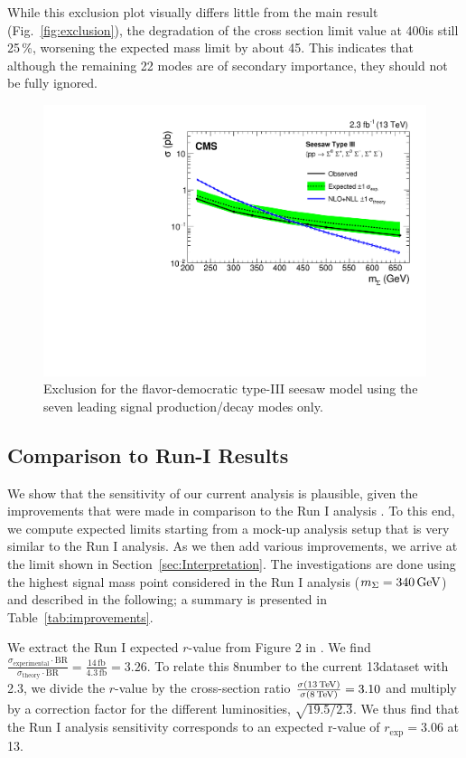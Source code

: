 While this exclusion plot visually differs little from the main result (Fig.~\ref{fig:exclusion}), the degradation of the cross section limit value at 400\GeV is still 25\,\%, worsening the expected mass limit by about 45\GeV. This indicates that although the remaining 22 modes are of secondary importance, they should not be fully ignored.

\begin{figure}
\begin{center}
	\includegraphics[width=.8\textwidth]{Results/exclusion-leading7}
	\caption{Exclusion for the flavor-democratic type-III seesaw model using the seven leading signal production/decay modes only.
	\label{fig:exclusion-leading7}}
\end{center}
\end{figure}

\subsection{Comparison to Run-I Results}
We show that the sensitivity of our current analysis is plausible, given the improvements that were made in comparison to the Run I analysis \cite{CMS-PAS-EXO-14-001}. To this end, we compute expected limits starting from a mock-up analysis setup that is very similar to the Run I analysis. As we then add various improvements, we arrive at the limit shown in Section~\ref{sec:Interpretation}. The investigations are done using the highest signal mass point considered in the Run I analysis ($m_\Sigma = 340\,\text{Ge\hspace{-.08em}V}$) and described in the following; a summary is presented in Table~\ref{tab:improvements}.

We extract the Run I expected $r$-value from Figure 2 in \cite{CMS-PAS-EXO-14-001}. We find $\frac{\sigma_\textrm{experimental} \cdot \textrm{BR}}{\sigma_\textrm{theory} \cdot \textrm{BR}} = \frac{14\,\textrm{fb}}{4.3\,\textrm{fb}} = 3.26$. To relate this 8\TeV number to the current 13\TeV dataset with 2.3\fbinv, we divide the $r$-value by the cross-section ratio $\frac{\sigma(13\,\text{Te\hspace{-.08em}V})}{\sigma(8\,\text{Te\hspace{-.08em}V})} = 3.10$ and multiply by a correction factor for the different luminosities, $\sqrt{19.5/2.3}$. We thus find that the Run I analysis sensitivity corresponds to an expected r-value of $r_\textrm{exp} = 3.06$ at 13\TeV.

